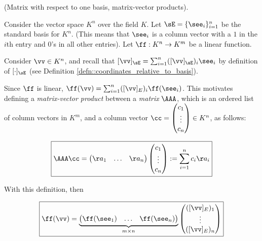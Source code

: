 
\begin{defn}
\label{defn::matrix_of_a_linear_function}

    (Matrix with respect to one basis, matrix-vector products). 
    
    Consider the vector space $K^n$ over the field $K$. Let $\sE = \{\see_i\}_{i = 1}^n$ be the standard basis for $K^n$. (This means that $\see_i$ is a column vector with a $1$ in the $i$th entry and $0$'s in all other entries). Let $\ff:K^n \rightarrow K^m$ be a linear function.
    
    Consider $\vv \in K^n$, and recall that $[\vv]_\sE = \sum_{i = 1}^n ([\vv]_\sE)_i \see_i$ by definition of $[\cdot]_\sE$ (see Definition \ref{defn::coordinates_relative_to_basis}).
    
    Since $\ff$ is linear, $\ff(\vv) = \sum_{i = 1}^n ([\vv]_E)_i \ff(\see_i)$. This motivates defining a \textit{matrix-vector product} between a \textit{matrix} $\AAA$, which is an ordered list of column vectors in $K^m$, and a column vector $\cc = 
    \begin{pmatrix} c_1 \\ \vdots \\ c_n \end{pmatrix} \in K^n$, as follows:
    
    \begin{align*}
        \boxed
        {
            \AAA \cc = 
            \begin{pmatrix} 
                \aa_1 & \hdots & \aa_n
            \end{pmatrix}
            \begin{pmatrix} c_1 \\ \vdots \\ c_n \end{pmatrix}
            :=
            \sum_{i = 1}^n c_i \aa_i
        }
    \end{align*}
    
    With this definition, then
    
    \begin{align*}
        \boxed
        {
            \ff(\vv) = \underbrace{\begin{pmatrix} \ff(\see_1) & \hdots & \ff(\see_n) \end{pmatrix}}_{m \times n} \begin{pmatrix} ([\vv]_E)_1 \\ \vdots \\ ([\vv]_E)_n \end{pmatrix}
        }
    \end{align*}
    

\end{defn}
